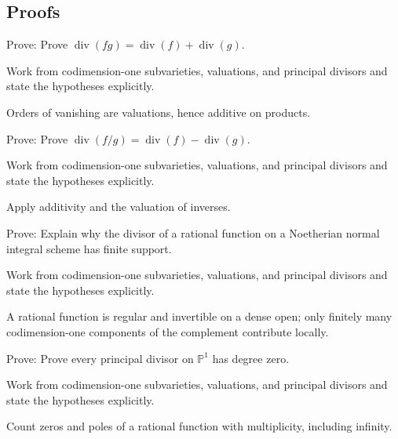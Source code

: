 \subsection*{Proofs}

\begin{exercise}[Additivity]\label{exr:vi39-expand-06}
Prove: Prove $\operatorname{div}(fg)=\operatorname{div}(f)+\operatorname{div}(g)$.
\end{exercise}
\begin{hint}
Work from codimension-one subvarieties, valuations, and principal divisors and state the hypotheses explicitly.
\end{hint}
\begin{solution}
Orders of vanishing are valuations, hence additive on products.
\end{solution}

\begin{exercise}[Ratio]\label{exr:vi39-expand-07}
Prove: Prove $\operatorname{div}(f/g)=\operatorname{div}(f)-\operatorname{div}(g)$.
\end{exercise}
\begin{hint}
Work from codimension-one subvarieties, valuations, and principal divisors and state the hypotheses explicitly.
\end{hint}
\begin{solution}
Apply additivity and the valuation of inverses.
\end{solution}

\begin{exercise}\label{exr:vi39-expand-08}
Prove: Explain why the divisor of a rational function on a Noetherian normal integral scheme has finite support.
\end{exercise}
\begin{hint}
Work from codimension-one subvarieties, valuations, and principal divisors and state the hypotheses explicitly.
\end{hint}
\begin{solution}
A rational function is regular and invertible on a dense open; only finitely many codimension-one components of the complement contribute locally.
\end{solution}

\begin{exercise}\label{exr:vi39-expand-09}
Prove: Prove every principal divisor on $\mathbb P^1$ has degree zero.
\end{exercise}
\begin{hint}
Work from codimension-one subvarieties, valuations, and principal divisors and state the hypotheses explicitly.
\end{hint}
\begin{solution}
Count zeros and poles of a rational function with multiplicity, including infinity.
\end{solution}


